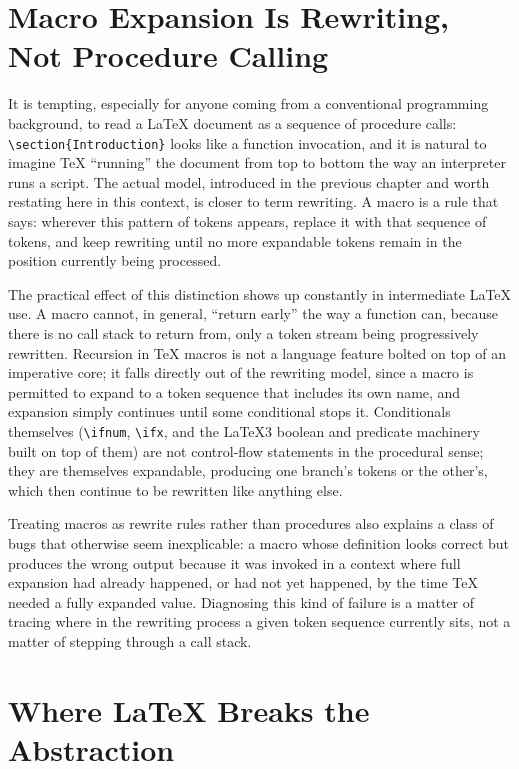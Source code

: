 \hypertarget{macro-expansion-is-rewriting-not-procedure-calling}{%
\section{Macro Expansion Is Rewriting, Not Procedure Calling}\label{macro-expansion-is-rewriting-not-procedure-calling}}

It is tempting, especially for anyone coming from a conventional programming background, to read a LaTeX document as a sequence of procedure calls: \texttt{\textbackslash{}section\{Introduction\}} looks like a function invocation, and it is natural to imagine TeX ``running'' the document from top to bottom the way an interpreter runs a script. The actual model, introduced in the previous chapter and worth restating here in this context, is closer to term rewriting. A macro is a rule that says: wherever this pattern of tokens appears, replace it with that sequence of tokens, and keep rewriting until no more expandable tokens remain in the position currently being processed.

The practical effect of this distinction shows up constantly in intermediate LaTeX use. A macro cannot, in general, ``return early'' the way a function can, because there is no call stack to return from, only a token stream being progressively rewritten. Recursion in TeX macros is not a language feature bolted on top of an imperative core; it falls directly out of the rewriting model, since a macro is permitted to expand to a token sequence that includes its own name, and expansion simply continues until some conditional stops it. Conditionals themselves (\texttt{\textbackslash{}ifnum}, \texttt{\textbackslash{}ifx}, and the LaTeX3 boolean and predicate machinery built on top of them) are not control-flow statements in the procedural sense; they are themselves expandable, producing one branch's tokens or the other's, which then continue to be rewritten like anything else.

Treating macros as rewrite rules rather than procedures also explains a class of bugs that otherwise seem inexplicable: a macro whose definition looks correct but produces the wrong output because it was invoked in a context where full expansion had already happened, or had not yet happened, by the time TeX needed a fully expanded value. Diagnosing this kind of failure is a matter of tracing where in the rewriting process a given token sequence currently sits, not a matter of stepping through a call stack.

\hypertarget{where-latex-breaks-the-abstraction}{%
\section{Where LaTeX Breaks the Abstraction}\label{where-latex-breaks-the-abstraction}}

